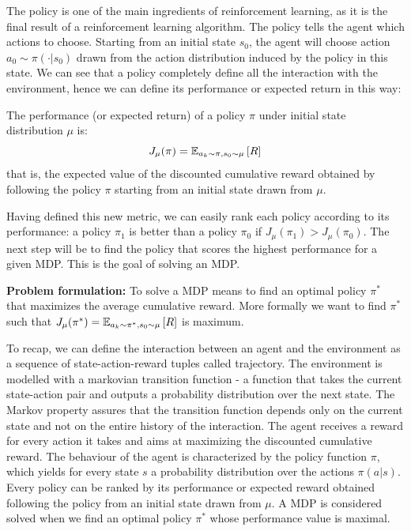 The policy is one of the main ingredients of reinforcement learning, as it is the final result of a reinforcement learning algorithm. The policy tells the agent which actions to choose.
Starting from an initial state $s_0$, the agent will choose action $a_0 \sim \pi(\cdot | s_0)$ drawn from the action distribution induced by the policy in this state. We can see that a policy completely define all the interaction with the environment, hence we can define its performance or expected return in this way:
\begin{definition}
The performance (or expected return) of a policy $\pi$ under initial state distribution $\mu$ is:
\[
J_\mu(\pi) = \EV[a_k \sim \pi, s_0 \sim \mu]{R}
\]
that is, the expected value of the discounted cumulative reward obtained by following the policy $\pi$ starting from an initial state drawn from $\mu$.
\end{definition}
Having defined this new metric, we can easily rank each policy according to its performance: a policy $\pi_1$ is better than a policy $\pi_0$ if $J_\mu(\pi_1) > J_\mu(\pi_0)$. The next step will be to find the policy that scores the highest performance for a given MDP. This is the goal of solving an MDP.

\textbf{Problem formulation:}\quad
To solve a MDP means to find an optimal policy $\pi^*$ that maximizes the average cumulative reward. More formally we want to find $\pi^*$ such that $J_\mu(\pi^*)=\EV[a_k \sim \pi^*, s_0 \sim \mu]{R}$ is maximum.

To recap, we can define the interaction between an agent and the environment as a sequence of state-action-reward tuples called trajectory. The environment is modelled with a markovian transition function - a function that takes the current state-action pair and outputs a probability distribution over the next state. The Markov property assures that the transition function depends only on the current state and not on the entire history of the interaction. The agent receives a reward for every action it takes and aims at maximizing the discounted cumulative reward. The behaviour of the agent is characterized by the policy function $\pi$, which yields for every state $s$ a probability distribution over the actions $\pi(a|s)$. Every policy can be ranked by its performance or expected reward obtained following the policy from an initial state drawn from $\mu$. A MDP is considered solved when we find an optimal policy $\pi^*$ whose performance value is maximal.

